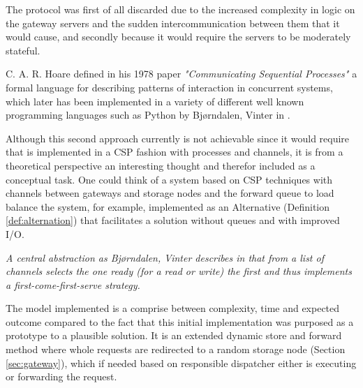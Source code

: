 The protocol was first of all discarded due to the increased complexity in logic on the gateway servers and the sudden intercommunication between them that it would cause, and secondly because it would require the servers to be moderately stateful.
\newline

C. A. R. Hoare defined in his 1978 paper \textit{"Communicating Sequential Processes"}\cite{Hoare:1978:CSP:359576.359585} a formal language for describing patterns of interaction in concurrent systems, which later has been implemented in a variety of different well known programming languages such as Python by Bj{\o}rndalen, Vinter \etal in \cite{bjorndalen2007pycsp}.
\newline

\noindent
Although this second approach currently is not achievable since it would require that \CodeName is implemented in a CSP fashion with processes and channels, it is from a theoretical perspective an interesting thought and therefor included as a conceptual task. One could think of a \CodeName system based on CSP techniques with channels between gateways and storage nodes and the forward queue to load balance the system, for example, implemented as an Alternative (Definition \ref{def:alternation}) that facilitates a solution without queues and with improved I/O.
\vspace*{3mm}
\begin{definition} \label{def:alternation}
\textit{A central abstraction as Bj{\o}rndalen, Vinter \etal describes in \cite{bjorndalen2007pycsp} that from a list of channels selects the one ready (for a read or write) the first and thus implements a first-come-first-serve strategy.}
\end{definition}

The model implemented is a comprise between complexity, time and expected outcome compared to the fact that this initial \CodeName implementation was purposed as a prototype to a plausible solution. It is an extended dynamic store and forward method where whole requests are redirected to a random storage node (Section \ref{sec:gateway}), which if needed based on responsible dispatcher either is executing or forwarding the request. 
\newline

